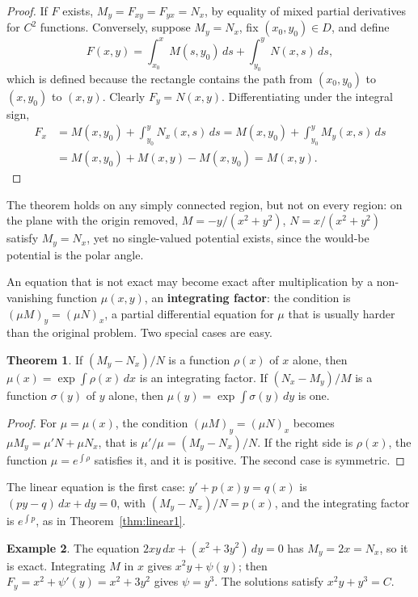 \documentclass[11pt,a4paper]{article}
\numberwithin{equation}{section}
\theoremstyle{definition}
\newtheorem{thm}{Theorem}[subsection]
\newtheorem{exa}[thm]{Example}
\begin{document}
\begin{proof}
If $F$ exists, $M_y = F_{xy} = F_{yx} = N_x$, by equality of mixed partial derivatives for $C^2$ functions. Conversely, suppose $M_y = N_x$, fix $(x_0, y_0) \in D$, and define
\[
F(x, y) = \int_{x_0}^xM(s, y_0)\,ds + \int_{y_0}^yN(x, s)\,ds ,
\]
which is defined because the rectangle contains the path from $(x_0, y_0)$ to $(x, y_0)$ to $(x, y)$. Clearly $F_y = N(x, y)$. Differentiating under the integral sign,
\begin{align*}
F_x &= M(x, y_0) + \int_{y_0}^yN_x(x, s)\,ds = M(x, y_0) + \int_{y_0}^yM_y(x, s)\,ds\\
&= M(x, y_0) + M(x, y) - M(x, y_0) = M(x, y) .
\end{align*}
\end{proof}

The theorem holds on any simply connected region, but not on every region: on the plane with the origin removed, $M = -y/(x^2 + y^2)$, $N = x/(x^2 + y^2)$ satisfy
$M_y = N_x$, yet no single-valued potential exists, since the would-be potential is the polar angle.

An equation that is not exact may become exact after multiplication by a non-vanishing function $\mu(x, y)$, an \textbf{integrating factor}: the condition is
$(\mu M)_y = (\mu N)_x$, a partial differential equation for $\mu$ that is usually harder than the original problem. Two special cases are easy.

\begin{thm}
\label{thm:intfactor}
If $(M_y - N_x)/N$ is a function $\rho(x)$ of $x$ alone, then $\mu(x) = \exp\int\rho(x)\,dx$ is an integrating factor. If $(N_x - M_y)/M$ is a function $\sigma(y)$ of $y$ alone, then
$\mu(y) = \exp\int\sigma(y)\,dy$ is one.
\end{thm}

\begin{proof}
For $\mu = \mu(x)$, the condition $(\mu M)_y = (\mu N)_x$ becomes $\mu M_y = \mu'N + \mu N_x$, that is $\mu'/\mu = (M_y - N_x)/N$. If the right side is $\rho(x)$, the function $\mu = e^{\int\rho}$
satisfies it, and it is positive. The second case is symmetric.
\end{proof}

The linear equation is the first case: $y' + p(x)y = q(x)$ is $(py - q)\,dx + dy = 0$, with $(M_y - N_x)/N = p(x)$, and the integrating factor is $e^{\int p}$, as in Theorem~\ref{thm:linear1}.

\begin{exa}
\label{ex:exact}
The equation $2xy\,dx + (x^2 + 3y^2)\,dy = 0$ has $M_y = 2x = N_x$, so it is exact. Integrating $M$ in $x$ gives $x^2y + \psi(y)$; then $F_y = x^2 + \psi'(y) = x^2 + 3y^2$ gives $\psi = y^3$.
The solutions satisfy $x^2y + y^3 = C$.
\end{exa}
\end{document}
